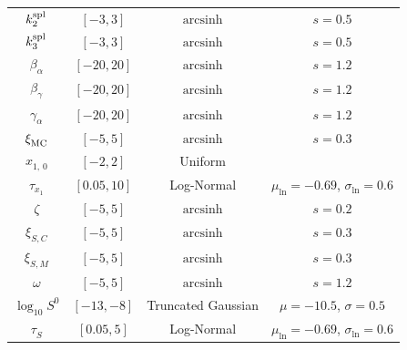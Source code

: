 \begin{table}
\begin{tabular}{cccc}
        $k_2^{\rm spl}$ & $[-3, 3]$ & $\mathrm{arcsinh}$ & $s = 0.5$ \\
        $k_3^{\rm spl}$ & $[-3, 3]$ & $\mathrm{arcsinh}$ & $s = 0.5$ \\
        \hline
        $\beta_\alpha^{}$ & $[-20, 20]$ & $\mathrm{arcsinh}$ & $s = 1.2$ \\
        $\beta_\gamma^{}$ & $[-20, 20]$ & $\mathrm{arcsinh}$ & $s = 1.2$ \\
        $\gamma_\alpha^{}$ & $[-20, 20]$ & $\mathrm{arcsinh}$ & $s = 1.2$ \\
        \hline
        $\xi_{\rm MC}^{}$ & $[-5, 5]$ & $\mathrm{arcsinh}$ & $s = 0.3$ \\
        $x_{1,\,0}^{}$ & $[-2, 2]$ & Uniform &  \\
        $\tau_{x_1}^{}$ & $[0.05, 10]$ & Log-Normal & $\mu_{\ln}^{} = -0.69$, $\sigma_{\ln}^{} = 0.6$ \\
        $\zeta$ & $[-5, 5]$ & $\mathrm{arcsinh}$ & $s = 0.2$ \\
        $\xi_{S,C}^{}$ & $[-5, 5]$ & $\mathrm{arcsinh}$ & $s = 0.3$ \\
        $\xi_{S,M}^{}$ & $[-5, 5]$ & $\mathrm{arcsinh}$ & $s = 0.3$ \\
        $\omega$ & $[-5, 5]$ & $\mathrm{arcsinh}$ & $s = 1.2$ \\
        $\log_{10}^{}S^0$ & $[-13, -8]$ & Truncated Gaussian & $\mu = -10.5$, $\sigma = 0.5$ \\
        $\tau_S^{}$ & $[0.05, 5]$ & Log-Normal & $\mu_{\ln}^{} = -0.69$, $\sigma_{\ln}^{} = 0.6$ \\
        \hline
    \end{tabular}
\end{table}
